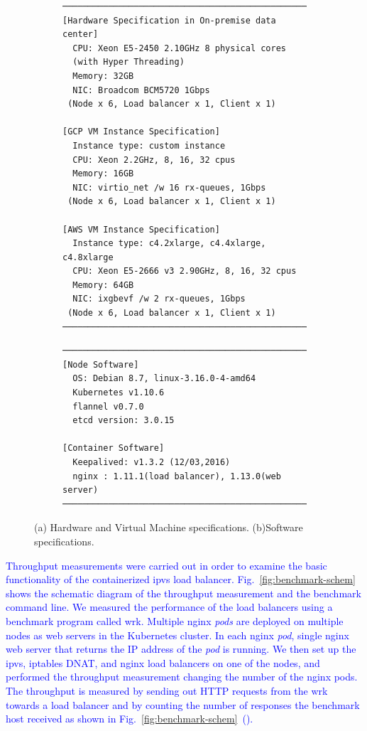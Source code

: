 \begin{figure}[tb]

  \begin{subfigure}[t]{\columnwidth}
\begin{Verbatim}[commandchars=\\\{\}]
───────────────────────────────────────────────────────
[Hardware Specification in On-premise data center]
  CPU: Xeon E5-2450 2.10GHz 8 physical cores
  (with Hyper Threading) 
  Memory: 32GB
  NIC: Broadcom BCM5720 1Gbps
 (Node x 6, Load balancer x 1, Client x 1)

[GCP VM Instance Specification]
  Instance type: custom instance
  CPU: Xeon 2.2GHz, 8, 16, 32 cpus
  Memory: 16GB
  NIC: virtio_net /w 16 rx-queues, 1Gbps
 (Node x 6, Load balancer x 1, Client x 1)

[AWS VM Instance Specification]
  Instance type: c4.2xlarge, c4.4xlarge, c4.8xlarge 
  CPU: Xeon E5-2666 v3 2.90GHz, 8, 16, 32 cpus
  Memory: 64GB
  NIC: ixgbevf /w 2 rx-queues, 1Gbps
 (Node x 6, Load balancer x 1, Client x 1)
───────────────────────────────────────────────────────
\end{Verbatim}
    \caption{}
    \label{fig:machine_spec}
  \end{subfigure}

  \begin{subfigure}[t]{\columnwidth}
\begin{Verbatim}[commandchars=\\\{\}]
───────────────────────────────────────────────────────
[Node Software]
  OS: Debian 8.7, linux-3.16.0-4-amd64
  Kubernetes v1.10.6
  flannel v0.7.0
  etcd version: 3.0.15

[Container Software]
  Keepalived: v1.3.2 (12/03,2016)
  nginx : 1.11.1(load balancer), 1.13.0(web server) 
───────────────────────────────────────────────────────
\end{Verbatim}
    \caption{}
    \label{fig:software_spec}
  \end{subfigure}

  \caption{
    (a) Hardware and Virtual Machine specifications. (b)Software specifications.
  }
  \label{fig:benchmark-spec}
\end{figure}

\textcolor{blue}{
Throughput measurements were carried out in order to examine the basic functionality of the containerized ipvs load balancer.
Fig.~\ref{fig:benchmark-schem} shows the schematic diagram of the throughput measurement and the benchmark command line.
We measured the performance of the load balancers using a benchmark program called wrk\cite{Glozer2016}.
Multiple nginx {\em pods} are deployed on multiple nodes as web servers in the Kubernetes cluster.
In each nginx {\em pod}, single nginx web server that returns the IP address of the {\em pod} is running.
We then set up the ipvs, iptables DNAT, and nginx load balancers on one of the nodes, and performed the throughput measurement changing the number of the nginx pods.
The throughput is measured by sending out HTTP requests from the wrk towards a load balancer and by counting the number of responses the benchmark host received as shown in Fig.~\ref{fig:benchmark-schem}~().
}

